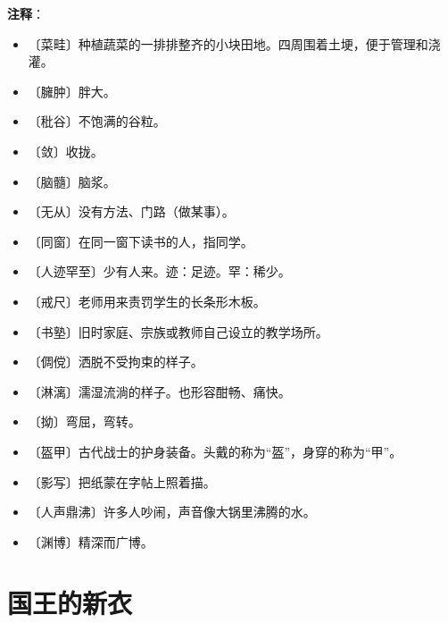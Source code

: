 \documentclass[12pt,UTF-8,openany]{ctexbook}
\begin{document}
\newpage

\textbf{注释}：

\vspace{-1em}

\begin{itemize}
    \setlength\itemsep{-0.2em}
    \item 〔菜畦〕种植蔬菜的一排排整齐的小块田地。四周围着土埂，便于管理和浇灌。
    \item 〔臃肿〕胖大。
    \item 〔秕谷〕不饱满的谷粒。
    \item 〔敛〕收拢。
    \item 〔脑髓〕脑浆。
    \item 〔无从〕没有方法、门路（做某事）。
    \item 〔同窗〕在同一窗下读书的人，指同学。
    \item 〔人迹罕至〕少有人来。迹：足迹。罕：稀少。
    \item 〔戒尺〕老师用来责罚学生的长条形木板。
    \item 〔书塾〕旧时家庭、宗族或教师自己设立的教学场所。
    \item 〔倜傥〕洒脱不受拘束的样子。
    \item 〔淋漓〕濡湿流淌的样子。也形容酣畅、痛快。
    \item 〔拗〕弯屈，弯转。
    \item 〔盔甲〕古代战士的护身装备。头戴的称为“盔”，身穿的称为“甲”。
    \item 〔影写〕把纸蒙在字帖上照着描。
    \item 〔人声鼎沸〕许多人吵闹，声音像大锅里沸腾的水。
    \item 〔渊博〕精深而广博。
\end{itemize}

\chapter{国王的新衣}
\end{document}
